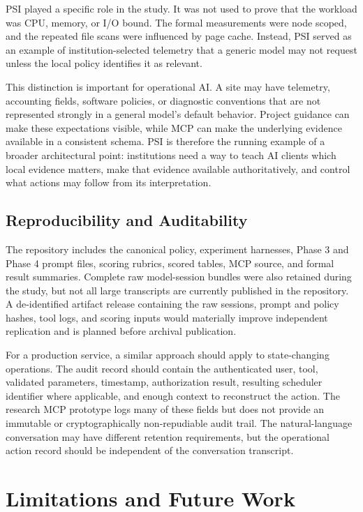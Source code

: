 \documentclass[11pt]{article}
\begin{document}
PSI played a specific role in the study. It was not used to prove that the workload was CPU, memory, or I/O bound. The formal measurements were node scoped, and the repeated file scans were influenced by page cache. Instead, PSI served as an example of institution-selected telemetry that a generic model may not request unless the local policy identifies it as relevant.

This distinction is important for operational AI. A site may have telemetry, accounting fields, software policies, or diagnostic conventions that are not represented strongly in a general model's default behavior. Project guidance can make these expectations visible, while MCP can make the underlying evidence available in a consistent schema. PSI is therefore the running example of a broader architectural point: institutions need a way to teach AI clients which local evidence matters, make that evidence available authoritatively, and control what actions may follow from its interpretation.

\subsection{Reproducibility and Auditability}

The repository includes the canonical policy, experiment harnesses, Phase 3 and Phase 4 prompt files, scoring rubrics, scored tables, MCP source, and formal result summaries. Complete raw model-session bundles were also retained during the study, but not all large transcripts are currently published in the repository. A de-identified artifact release containing the raw sessions, prompt and policy hashes, tool logs, and scoring inputs would materially improve independent replication and is planned before archival publication.

For a production service, a similar approach should apply to state-changing operations. The audit record should contain the authenticated user, tool, validated parameters, timestamp, authorization result, resulting scheduler identifier where applicable, and enough context to reconstruct the action. The research MCP prototype logs many of these fields but does not provide an immutable or cryptographically non-repudiable audit trail. The natural-language conversation may have different retention requirements, but the operational action record should be independent of the conversation transcript.

\section{Limitations and Future Work}
\end{document}
